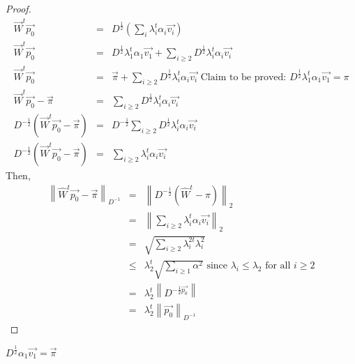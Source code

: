 \documentclass[12pt]{article}
\newcommand\norm[1]{\left\lVert#1\right\rVert}
\begin{document}
\begin{proof}
\begin{eqnarray*}
\vec{W}^t\vec{p_0} &=& D^{\frac{1}{2}}\left( \sum_i \lambda_i^t\alpha_i\vec{v_i}\right)\\
\vec{W}^t\vec{p_0} &=& D^{\frac{1}{2}}\lambda_1^t\alpha_1\vec{v_1} + \sum_{i\geq2}D^{\frac{1}{2}}\lambda_i^t\alpha_i\vec{v_i}\\
\vec{W}^t\vec{p_0} &=& \vec{\pi}+ \sum_{i\geq2}D^{\frac{1}{2}}\lambda_i^t\alpha_i\vec{v_i} \text{ \ \ \ \ \ \ \ \ \ \ \ \ \ \ \ \ Claim to be proved: } D^{\frac{1}{2}}\lambda_1^t\alpha_1\vec{v_1} = \pi\\
\vec{W}^t\vec{p_0}  - \vec{\pi} &=& \sum_{i\geq2}D^{\frac{1}{2}}\lambda_i^t\alpha_i\vec{v_i}\\
D^{-\frac{1}{2}}(\vec{W}^t\vec{p_0}  - \vec{\pi}) &=& D^{-\frac{1}{2}}\sum_{i\geq2}D^{\frac{1}{2}}\lambda_i^t\alpha_i\vec{v_i}\\
D^{-\frac{1}{2}}(\vec{W}^t\vec{p_0}  - \vec{\pi}) &=& \sum_{i \geq 2} \lambda_i^t\alpha_i\vec{v_i}
\end{eqnarray*}
Then,
\begin{eqnarray*}
\norm{\widehat{W}^t\vec{p_0}-\vec{\pi}}_{D^{-1}} &=& \norm{D^{-\frac{1}{2}}\left(\widehat{W}^t - \pi \right)}_2\\
&=& \norm{\sum_{i \geq 2} \lambda_i^t \alpha_i \vec{v_i}}_2\\
&=& \sqrt{\sum_{i \geq 2} \lambda_i^{2t}\lambda_i^2} \\
&\leq& \lambda_2^t \sqrt{\sum_{i \geq 1}\alpha^2}\text{\ \ \ \ \ \ \ \ \ \ \ \ \ since } \lambda_i \leq \lambda_2 \text{ for all } i \geq 2\\
&=& \lambda_2^t \norm{D^{-\frac{1}{2}\vec{p_0}}}\\
&=&  \lambda_2^t \norm{\vec{p_0}}_{D^{-1}}
\end{eqnarray*}
\end{proof}
\newpage
\begin{claim}
$D^{\frac{1}{2}}\alpha_1\vec{v_1} = \vec{\pi}$
\end{claim}
\end{document}
